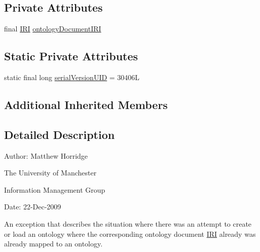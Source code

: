 \subsection*{Private Attributes}
\begin{DoxyCompactItemize}
\item 
final \hyperlink{classorg_1_1semanticweb_1_1owlapi_1_1model_1_1_i_r_i}{I\-R\-I} \hyperlink{classorg_1_1semanticweb_1_1owlapi_1_1model_1_1_o_w_l_ontology_document_already_exists_exception_a76fd2f2691f17524e0f9c483befa83ca}{ontology\-Document\-I\-R\-I}
\end{DoxyCompactItemize}
\subsection*{Static Private Attributes}
\begin{DoxyCompactItemize}
\item 
static final long \hyperlink{classorg_1_1semanticweb_1_1owlapi_1_1model_1_1_o_w_l_ontology_document_already_exists_exception_abe2876c000261c205091627b80d7fe15}{serial\-Version\-U\-I\-D} = 30406\-L
\end{DoxyCompactItemize}
\subsection*{Additional Inherited Members}


\subsection{Detailed Description}
Author\-: Matthew Horridge\par
 The University of Manchester\par
 Information Management Group\par
 Date\-: 22-\/\-Dec-\/2009 

An exception that describes the situation where there was an attempt to create or load an ontology where the corresponding ontology document \hyperlink{classorg_1_1semanticweb_1_1owlapi_1_1model_1_1_i_r_i}{I\-R\-I} already was already mapped to an ontology. 


